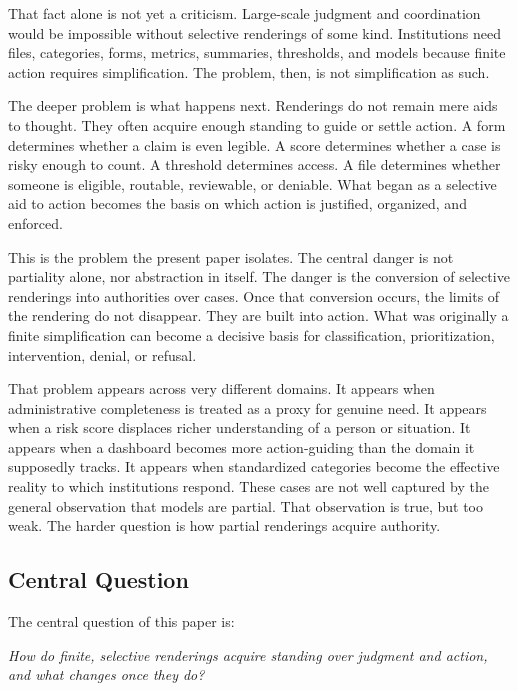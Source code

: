 \documentclass[11pt]{article}
\renewenvironment{quote}
  {\list{}{\leftmargin=1.4em \rightmargin=1.0em}%
   \item\relax\color{softink}\itshape}
  {\endlist}
\begin{document}
That fact alone is not yet a criticism. Large-scale judgment and coordination would be impossible without selective renderings of some kind. Institutions need files, categories, forms, metrics, summaries, thresholds, and models because finite action requires simplification.\cite{Simon1996SciencesArtificial,Scott1998SeeingLikeState} The problem, then, is not simplification as such.

The deeper problem is what happens next. Renderings do not remain mere aids to thought. They often acquire enough standing to guide or settle action. A form determines whether a claim is even legible. A score determines whether a case is risky enough to count. A threshold determines access. A file determines whether someone is eligible, routable, reviewable, or deniable. What began as a selective aid to action becomes the basis on which action is justified, organized, and enforced.\cite{Porter1995TrustInNumbers,Power1997AuditSociety,BowkerStar1999SortingThingsOut}

This is the problem the present paper isolates. The central danger is not partiality alone, nor abstraction in itself. The danger is the conversion of selective renderings into authorities over cases. Once that conversion occurs, the limits of the rendering do not disappear. They are built into action. What was originally a finite simplification can become a decisive basis for classification, prioritization, intervention, denial, or refusal.

That problem appears across very different domains. It appears when administrative completeness is treated as a proxy for genuine need. It appears when a risk score displaces richer understanding of a person or situation. It appears when a dashboard becomes more action-guiding than the domain it supposedly tracks. It appears when standardized categories become the effective reality to which institutions respond.\cite{Scott1998SeeingLikeState,Eubanks2018AutomatingInequality,Power1997AuditSociety} These cases are not well captured by the general observation that models are partial. That observation is true, but too weak. The harder question is how partial renderings acquire authority.

\subsection{Central Question}

The central question of this paper is:

\begin{quote}
How do finite, selective renderings acquire standing over judgment and action, and what changes once they do?
\end{quote}
\end{document}
